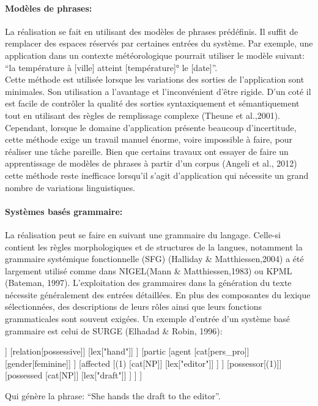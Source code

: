 	\paragraph{Modèles de phrases:} La réalisation se fait en utilisant des modèles de phrases prédéfinis. Il suffit de remplacer des espaces réservés par certaines entrées du système. Par exemple, une application dans un contexte météorologique pourrait utiliser le modèle suivant: “la température à [ville] atteint [température]° le [date]”.\\
Cette méthode est utilisée lorsque les variations des sorties de l’application sont minimales. Son utilisation a l’avantage et l’inconvénient d’être rigide. D’un coté il est facile de contrôler la qualité des sorties syntaxiquement et sémantiquement tout en utilisant des règles de remplissage complexe (Theune et al.,2001). Cependant, lorsque le domaine d’application présente beaucoup d’incertitude, cette méthode exige un travail manuel énorme, voire impossible à faire, pour réaliser une tâche pareille. Bien que certains travaux ont essayer de faire un apprentissage de modèles de phrases à partir d’un corpus (Angeli et al., 2012) cette méthode reste inefficace lorsqu’il s’agit d’application qui nécessite un grand nombre de variations linguistiques.
	\paragraph{Systèmes basés grammaire:} La réalisation peut se faire en suivant une grammaire du langage. Celle-si contient les règles morphologiques et de structures de la langues, notamment la grammaire systémique fonctionnelle (SFG) (Halliday \& Matthiessen,2004) a été largement utilisé comme dans NIGEL(Mann \& Matthiessen,1983) ou KPML (Bateman, 1997). L’exploitation des grammaires dans la génération du texte nécessite généralement des entrées détaillées. En plus des composantes du lexique sélectionnées, des descriptions de leurs rôles ainsi que leurs fonctions grammaticales sont souvent exigées. Un exemple d’entrée d’un système basé grammaire est celui de SURGE (Elhadad \& Robin, 1996):
	\begin{center}
		\begin{forest} [
			[cat:clause]
			[process
			[type[composite]]
			[relation[possessive]]
			[lex[\color{red}"hand"]]
			]
			[partic
			[agent
			[cat[pers\_pro]]
			[gender[feminine]]
			]
			[affected
			[(1)
			[cat[NP]]
			[lex[\color{red}"editor"]]
			]
			]
			[possessor[(1)]]
			[possessed
			[cat[NP]]
			[lex[\color{red}"draft"]]
			]
			]
			]
		\end{forest}
	\end{center}
	Qui génère la phrase: “She hands the draft to the editor”.\newline

